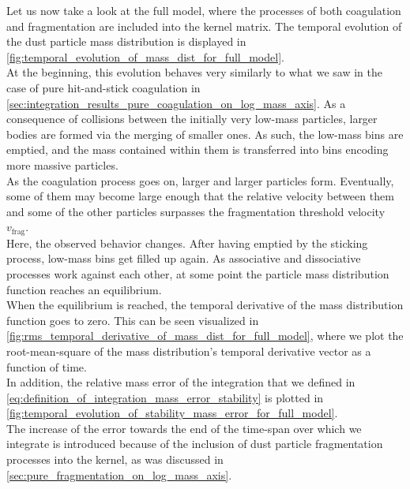         Let us now take a look at the full model, where the processes of both coagulation and 
        fragmentation are included into the kernel matrix. The temporal evolution of the dust 
        particle mass distribution is displayed in
        \cref{fig:temporal_evolution_of_mass_dist_for_full_model}. \\

        At the beginning, this evolution behaves very similarly to what we saw in the case of 
        pure hit-and-stick coagulation in
        \cref{sec:integration_results_pure_coagulation_on_log_mass_axis}. 
        As a consequence of collisions between the initially very low-mass particles, 
        larger bodies are formed via the merging of smaller ones. As such, the low-mass bins 
        are emptied, and the mass contained within them is transferred into bins encoding 
        more massive particles. \\

        As the coagulation process goes on, larger and larger particles form. Eventually,
        some of them may become large enough that the relative velocity between them and 
        some of the other particles surpasses the fragmentation threshold velocity 
        $v_\text{frag}$. \\

        Here, the observed behavior changes. After having emptied by the sticking process, 
        low-mass bins get filled up again. As associative and dissociative processes work 
        against each other, at some point the particle mass distribution function reaches 
        an equilibrium. \\

        When the equilibrium is reached, the temporal derivative of the mass distribution 
        function goes to zero. This can be seen visualized in 
        \cref{fig:rms_temporal_derivative_of_mass_dist_for_full_model}, where we plot 
        the root-mean-square of the mass distribution's temporal derivative vector as a 
        function of time. \\

        In addition, the relative mass error of the integration that we defined in 
        \cref{eq:definition_of_integration_mass_error_stability} is plotted in 
        \cref{fig:temporal_evolution_of_stability_mass_error_for_full_model}. \\

        The increase of the error towards the end of the time-span over which we 
        integrate is introduced because of the inclusion of dust particle 
        fragmentation processes into the kernel, as was discussed in
        \cref{sec:pure_fragmentation_on_log_mass_axis}.

